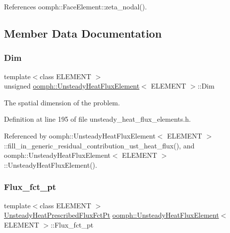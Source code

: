 References oomph\+::\+Face\+Element\+::zeta\+\_\+nodal().



\subsection{Member Data Documentation}
\mbox{\label{classoomph_1_1UnsteadyHeatFluxElement_a1e1a8cab700a63bcafe6ff3643cdfd51}} 
\subsubsection{\texorpdfstring{Dim}{Dim}}
{\footnotesize\ttfamily template$<$class E\+L\+E\+M\+E\+NT $>$ \\
unsigned \hyperlink{classoomph_1_1UnsteadyHeatFluxElement}{oomph\+::\+Unsteady\+Heat\+Flux\+Element}$<$ E\+L\+E\+M\+E\+NT $>$\+::Dim\hspace{0.3cm}{\ttfamily [private]}}



The spatial dimension of the problem. 



Definition at line 195 of file unsteady\+\_\+heat\+\_\+flux\+\_\+elements.\+h.



Referenced by oomph\+::\+Unsteady\+Heat\+Flux\+Element$<$ E\+L\+E\+M\+E\+N\+T $>$\+::fill\+\_\+in\+\_\+generic\+\_\+residual\+\_\+contribution\+\_\+ust\+\_\+heat\+\_\+flux(), and oomph\+::\+Unsteady\+Heat\+Flux\+Element$<$ E\+L\+E\+M\+E\+N\+T $>$\+::\+Unsteady\+Heat\+Flux\+Element().

\mbox{\label{classoomph_1_1UnsteadyHeatFluxElement_a49f232c696f25117cad07bcee6e0c868}} 
\subsubsection{\texorpdfstring{Flux\+\_\+fct\+\_\+pt}{Flux\_fct\_pt}}
{\footnotesize\ttfamily template$<$class E\+L\+E\+M\+E\+NT $>$ \\
\hyperlink{classoomph_1_1UnsteadyHeatFluxElement_ab60a211e1cee492be6c9b93d6aa36883}{Unsteady\+Heat\+Prescribed\+Flux\+Fct\+Pt} \hyperlink{classoomph_1_1UnsteadyHeatFluxElement}{oomph\+::\+Unsteady\+Heat\+Flux\+Element}$<$ E\+L\+E\+M\+E\+NT $>$\+::Flux\+\_\+fct\+\_\+pt\hspace{0.3cm}{\ttfamily [private]}}




